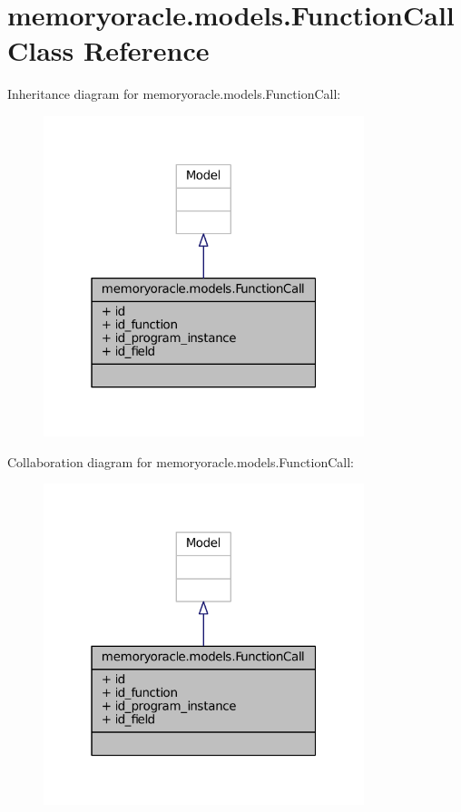 \hypertarget{classmemoryoracle_1_1models_1_1FunctionCall}{}\section{memoryoracle.\+models.\+Function\+Call Class Reference}
\label{classmemoryoracle_1_1models_1_1FunctionCall}


Inheritance diagram for memoryoracle.\+models.\+Function\+Call\+:
\nopagebreak
\begin{figure}[H]
\begin{center}
\leavevmode
\includegraphics[width=265pt]{classmemoryoracle_1_1models_1_1FunctionCall__inherit__graph}
\end{center}
\end{figure}


Collaboration diagram for memoryoracle.\+models.\+Function\+Call\+:
\nopagebreak
\begin{figure}[H]
\begin{center}
\leavevmode
\includegraphics[width=265pt]{classmemoryoracle_1_1models_1_1FunctionCall__coll__graph}
\end{center}
\end{figure}
